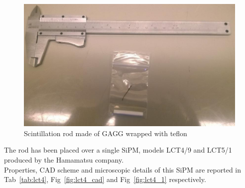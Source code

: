 \documentclass[10pt,a4paper, openany]{book}
\begin{document}
\begin{figure}[!h]
\begin{center}
\includegraphics[scale=0.33]{imm/gagg1.jpg}
\end{center}
\caption{Scintillation rod made of GAGG wrapped with teflon}
\label{fig:gagg1}
\end{figure}

The rod has been placed over a single SiPM, models LCT4/9 and LCT5/1 produced by the Hamamatsu company.\\
Properties, CAD scheme and microscopic details of this SiPM are reported in Tab~\ref{tab:lct4}, Fig~\ref{fig:lct4_cad} and Fig~\ref{fig:lct4_1} respectively.
\end{document}
